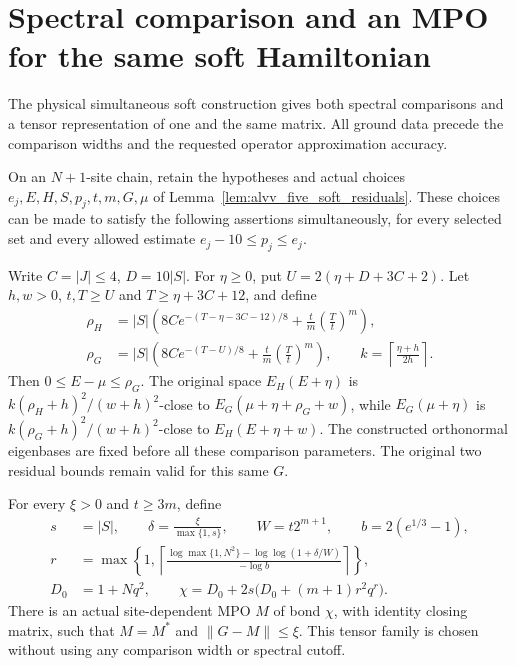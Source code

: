 \section{Spectral comparison and an MPO for the same soft Hamiltonian}
\label{sec:alvv_soft_representation}

The physical simultaneous soft construction gives both spectral
comparisons and a tensor representation of one and the same matrix.
All ground data precede the comparison widths and the requested
operator approximation accuracy.

\begin{lemma}
    \label{lem:alvv_same_soft_representation}
    \leanok
    On an $N+1$-site chain, retain the hypotheses and actual choices
    $e_j,E,H,S,p_j,t,m,G,\mu$ of
    Lemma~\ref{lem:alvv_five_soft_residuals}.
    These choices can be made to satisfy the following assertions
    simultaneously, for every selected set and every allowed
    estimate $e_j-10\leq p_j\leq e_j$.

    Write $C=|J|\leq4$, $D=10|S|$. For $\eta\geq0$, put
    $U=2(\eta+D+3C+2)$. Let $h,w>0$, $t,T\geq U$ and
    $T\geq\eta+3C+12$, and define
    \begin{align}
        \rho_H & =|S|\left(8Ce^{-(T-\eta-3C-12)/8}
        +\frac{t}{m}\left(\frac Tt\right)^m\right), \\
        \rho_G & =|S|\left(8Ce^{-(T-U)/8}
        +\frac{t}{m}\left(\frac Tt\right)^m\right),\qquad
        k=\left\lceil\frac{\eta+h}{2h}\right\rceil.
    \end{align}
    Then $0\leq E-\mu\leq\rho_G$. The original space
    $E_H(E+\eta)$ is
    $k(\rho_H+h)^2/(w+h)^2$-close to
    $E_G(\mu+\eta+\rho_G+w)$, while $E_G(\mu+\eta)$ is
    $k(\rho_G+h)^2/(w+h)^2$-close to $E_H(E+\eta+w)$.
    The constructed orthonormal eigenbases are fixed before all
    these comparison parameters. The original two residual bounds
    remain valid for this same $G$.

    For every $\xi>0$ and $t\geq3m$, define
    \begin{align}
        s   & =|S|,\qquad \delta=\frac{\xi}{\max\{1,s\}},\qquad
        W=t2^{m+1},\qquad b=2(e^{1/3}-1),                       \\
        r   & =\max\left\{1,
        \left\lceil\frac{\log\max\{1,N^2\}
        -\log\log(1+\delta/W)}{-\log b}\right\rceil\right\},    \\
        D_0 & =1+Nq^2,\qquad
        \chi=D_0+2s\bigl(D_0+(m+1)r^2q^r\bigr).
    \end{align}
    There is an actual site-dependent MPO $M$ of bond $\chi$, with
    identity closing matrix, such that $M=M^*$ and $\|G-M\|\leq\xi$.
    This tensor family is chosen without using any comparison
    width or spectral cutoff.
\end{lemma}
